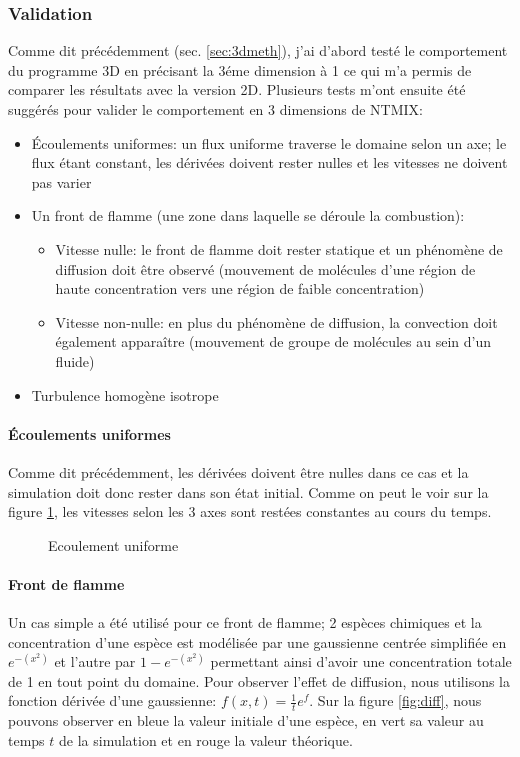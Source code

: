 \subsubsection{Validation}\label{sec:3D-validation}
Comme dit précédemment (sec. \ref{sec:3dmeth}), j'ai d'abord testé le comportement du programme 3D en précisant la 3éme dimension à 1 ce qui m'a permis de comparer les résultats avec la version 2D. Plusieurs tests m'ont ensuite été suggérés pour valider le comportement en 3 dimensions de NTMIX:

\begin{itemize}
\item Écoulements uniformes: un flux uniforme traverse le domaine selon un axe; le flux étant constant, les dérivées doivent rester nulles et les vitesses ne doivent pas varier
\item Un front de flamme (une zone dans laquelle se déroule la combustion):
  \begin{itemize}
  \item Vitesse nulle: le front de flamme doit rester statique et un phénomène de diffusion doit être observé (mouvement de molécules d'une région de haute concentration vers une région de faible concentration)
  \item Vitesse non-nulle: en plus du phénomène de diffusion, la convection doit également apparaître (mouvement de groupe de molécules au sein d'un fluide)
  \end{itemize}
\item Turbulence homogène isotrope
\end{itemize}

\paragraph{Écoulements uniformes}
Comme dit précédemment, les dérivées doivent être nulles dans ce cas et la simulation doit donc rester dans son état initial. Comme on peut le voir sur la figure \ref{fig:uniform_flow}, les vitesses selon les 3 axes sont restées constantes au cours du temps.
 
\begin{figure}[ht]
  \centering
  \caption{\label{fig:uniform_flow}Ecoulement uniforme}
\end{figure}

\paragraph{Front de flamme}
Un cas simple a été utilisé pour ce front de flamme; 2 espèces chimiques et la concentration d'une espèce est modélisée par une gaussienne centrée simplifiée en $e^{-(x^2)}$ et l'autre par $1-e^{-(x^2)}$ permettant ainsi d'avoir une concentration totale de 1 en tout point du domaine. Pour observer l'effet de diffusion, nous utilisons la fonction dérivée d'une gaussienne: $f(x,t)=\frac{1}{t}e^{f}$. Sur la figure \ref{fig:diff}, nous pouvons observer en bleue la valeur initiale d'une espèce, en vert sa valeur au temps $t$ de la simulation et en rouge la valeur théorique.

